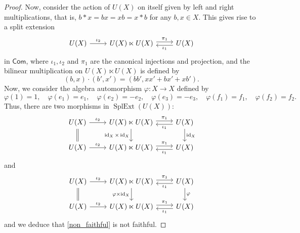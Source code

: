\documentclass[reqno,a4paper]{amsart}
\theoremstyle{plain}
\theoremstyle{definition}
\theoremstyle{remark}
\numberwithin{equation}{section}
\DeclareMathOperator{\SplExt}{SplExt}
\DeclareMathOperator{\id}{id}
\newcommand{\Com}{\ensuremath{\mathsf{Com}}}
\begin{document}
\begin{proof}
Now, consider the action of $U(X)$ on itself given by left and right multiplications, that is, $b \ast x=bx=xb=x \ast b$ for any $b,x \in X$. This gives rise to a split extension
\begin{equation}\label{non_faithful}
\begin{tikzcd}
U(X) \arrow [r, "\iota_2"]
& U(X) \ltimes U(X) \arrow[r, shift left, "\pi_1"] &
U(X) \ar[l, shift left, "\iota_1"]
\end{tikzcd}        
\end{equation}
in $\Com$, where $\iota_1,\iota_2$ and $\pi_1$ are the canonical injections and projection, and the bilinear multiplication on $U(X) \ltimes U(X)$ is defined by
\[
(b,x) \cdot (b',x')=(bb',xx'+bx'+xb').
\]
Now, we consider the algebra automorphism $\varphi \colon X \to X$ defined by
\[
\varphi(1)=1, \quad \varphi(e_1)=e_1, \quad \varphi(e_2)=-e_2, \quad \varphi(e_3)=-e_3, \quad \varphi(f_1)=f_1, \quad \varphi(f_2)=f_2.
\]
Thus, there are two morphisms in $\SplExt(U(X))$:
\[
\begin{tikzcd}
U(X) \arrow [r, "\iota_2"] \ar[d, equal]
&U(X) \ltimes U(X) \arrow[r, shift left, "\pi_1"] \ar[d, "\id_X \times \id_X"']&
U(X) \ar[l, shift left, "\iota_1"]\ar[d, "\id_X"] \\
U(X) \arrow [r, "\iota_2"]
& U(X) \ltimes U(X) \arrow[r, shift left, "\pi_1"] &
U(X) \ar[l, shift left, "\iota_1"]
\end{tikzcd}
\]
and
\[
\begin{tikzcd}
U(X) \arrow [r, "\iota_2"] \ar[d, equal]
&U(X) \ltimes U(X) \arrow[r, shift left, "\pi_1"] \ar[d, "\varphi \times \id_X"']&
U(X) \ar[l, shift left, "\iota_1"]\ar[d, "\varphi"] \\
U(X) \arrow [r, "\iota_2"]
& U(X) \ltimes U(X) \arrow[r, shift left, "\pi_1"] &
U(X) \ar[l, shift left, "\iota_1"]
\end{tikzcd}
\]
and we deduce that \eqref{non_faithful} is not faithful.


\end{proof}
\end{document}
